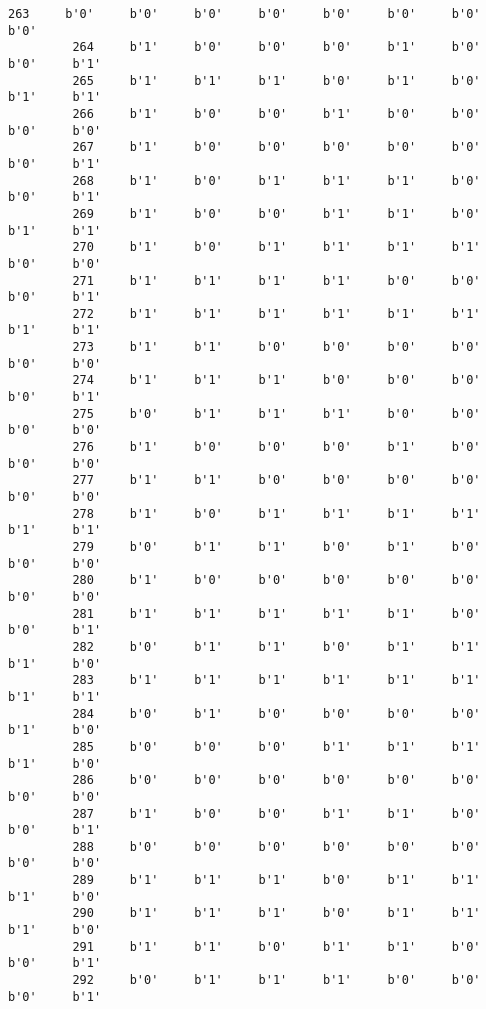 \documentclass[11pt]{article}
\begin{document}
\begin{Verbatim}[commandchars=\\\{\}]
         263     b'0'     b'0'     b'0'     b'0'     b'0'     b'0'     b'0'     b'0'   
         264     b'1'     b'0'     b'0'     b'0'     b'1'     b'0'     b'0'     b'1'   
         265     b'1'     b'1'     b'1'     b'0'     b'1'     b'0'     b'1'     b'1'   
         266     b'1'     b'0'     b'0'     b'1'     b'0'     b'0'     b'0'     b'0'   
         267     b'1'     b'0'     b'0'     b'0'     b'0'     b'0'     b'0'     b'1'   
         268     b'1'     b'0'     b'1'     b'1'     b'1'     b'0'     b'0'     b'1'   
         269     b'1'     b'0'     b'0'     b'1'     b'1'     b'0'     b'1'     b'1'   
         270     b'1'     b'0'     b'1'     b'1'     b'1'     b'1'     b'0'     b'0'   
         271     b'1'     b'1'     b'1'     b'1'     b'0'     b'0'     b'0'     b'1'   
         272     b'1'     b'1'     b'1'     b'1'     b'1'     b'1'     b'1'     b'1'   
         273     b'1'     b'1'     b'0'     b'0'     b'0'     b'0'     b'0'     b'0'   
         274     b'1'     b'1'     b'1'     b'0'     b'0'     b'0'     b'0'     b'1'   
         275     b'0'     b'1'     b'1'     b'1'     b'0'     b'0'     b'0'     b'0'   
         276     b'1'     b'0'     b'0'     b'0'     b'1'     b'0'     b'0'     b'0'   
         277     b'1'     b'1'     b'0'     b'0'     b'0'     b'0'     b'0'     b'0'   
         278     b'1'     b'0'     b'1'     b'1'     b'1'     b'1'     b'1'     b'1'   
         279     b'0'     b'1'     b'1'     b'0'     b'1'     b'0'     b'0'     b'0'   
         280     b'1'     b'0'     b'0'     b'0'     b'0'     b'0'     b'0'     b'0'   
         281     b'1'     b'1'     b'1'     b'1'     b'1'     b'0'     b'0'     b'1'   
         282     b'0'     b'1'     b'1'     b'0'     b'1'     b'1'     b'1'     b'0'   
         283     b'1'     b'1'     b'1'     b'1'     b'1'     b'1'     b'1'     b'1'   
         284     b'0'     b'1'     b'0'     b'0'     b'0'     b'0'     b'1'     b'0'   
         285     b'0'     b'0'     b'0'     b'1'     b'1'     b'1'     b'1'     b'0'   
         286     b'0'     b'0'     b'0'     b'0'     b'0'     b'0'     b'0'     b'0'   
         287     b'1'     b'0'     b'0'     b'1'     b'1'     b'0'     b'0'     b'1'   
         288     b'0'     b'0'     b'0'     b'0'     b'0'     b'0'     b'0'     b'0'   
         289     b'1'     b'1'     b'1'     b'0'     b'1'     b'1'     b'1'     b'0'   
         290     b'1'     b'1'     b'1'     b'0'     b'1'     b'1'     b'1'     b'0'   
         291     b'1'     b'1'     b'0'     b'1'     b'1'     b'0'     b'0'     b'1'   
         292     b'0'     b'1'     b'1'     b'1'     b'0'     b'0'     b'0'     b'1'   

\end{Verbatim}
\end{document}
